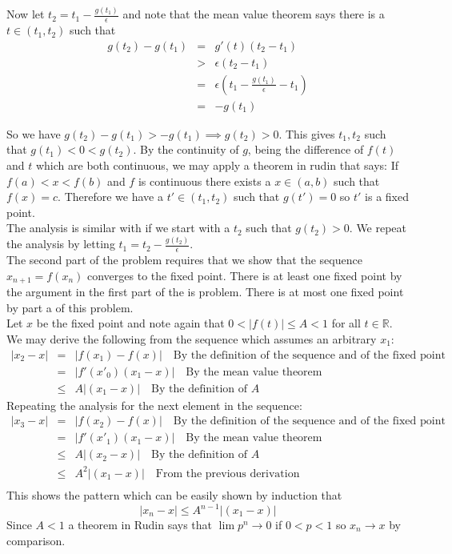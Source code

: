 \documentclass[11pt,reqno]{article}
\begin{document}
\noindent Now let $t_2 = t_1 - \frac{g(t_1)}{\epsilon}$ and note that the mean value theorem says there is a $t \in (t_1, t_2)$ such that 
\begin{eqnarray*}
g(t_2)-g(t_1) &=& g'(t)(t_2-t_1) \\
		     &>& \epsilon (t_2 - t_1) \\
		     &=& \epsilon(t_1 - \frac{g(t_1)}{\epsilon} - t_1) \\
		     &=& -g(t_1)
\end{eqnarray*}

So we have $g(t_2)-g(t_1) > -g(t_1) \implies g(t_2) > 0$. This gives $t_1, t_2$ such that $g(t_1) < 0 < g(t_2)$. By the continuity of $g$, being the difference of $f(t)$ and $t$ which are both continuous, we may apply a theorem in rudin that says: If $f(a) < x < f(b)$ and $f$ is continuous there exists a $x \in (a,b)$ such that $f(x) = c$. Therefore we have a $t' \in (t_1,t_2)$ such that $g(t') = 0$ so $t'$ is a fixed point.\\
\indent The analysis is similar with if we start with a $t_2$ such that $g(t_2) > 0$. We repeat the analysis by letting $t_1 = t_2 - \frac{g(t_2)}{\epsilon}$.\\
\indent The second part of the problem requires that we show that the sequence $x_{n+1} = f(x_n)$ converges to the fixed point. There is at least one fixed point by the argument in the first part of the is problem. There is at most one fixed point by part a of this problem.\\
\indent Let $x$ be the fixed point and note again that $0 < |f(t)| \le A < 1$ for all $t \in \mathbb{R}$. We may derive the following from the sequence which assumes an arbitrary $x_1$:
\begin{eqnarray*}
|x_2 -x| &=& |f(x_1)-f(x)|  \quad \text{By the definition of the sequence and of the fixed point} \\
	   &=& |f'(x'_0)(x_1-x)| \quad \text{By the mean value theorem} \\ 
	   &\le& A |(x_1-x)| \quad \text{By the definition of $A$}
\end{eqnarray*}
Repeating the analysis for the next element in the sequence:
\begin{eqnarray*}
|x_3 -x| &=& |f(x_2)-f(x)|  \quad \text{By the definition of the sequence and of the fixed point} \\
	   &=& |f'(x'_1)(x_1-x)| \quad \text{By the mean value theorem} \\ 
	   &\le& A |(x_2-x)| \quad \text{By the definition of $A$} \\
  	   &\le& A^2 |(x_1-x)| \quad \text{From the previous derivation} \\
\end{eqnarray*}
This shows the pattern which can be easily shown by induction that
\begin{equation*}
|x_n-x| \le A^{n-1}|(x_1-x)|
\end{equation*}
Since $A < 1$ a theorem in Rudin says that $\lim p^n \to 0$ if $0 < p < 1$ so $x_n \to x$ by comparison.
\end{document}
